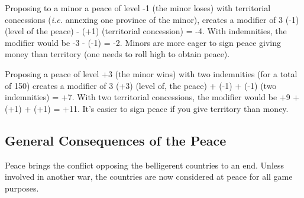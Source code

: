 



\begin{exemple}
  Proposing to a minor a peace of level -1 (the minor loses) with territorial
  concessions (\emph{i.e.} annexing one province of the minor), creates a
  modifier of 3 \textmultiply (-1) (level of the peace) - (+1) (territorial
  concession) = -4. With indemnities, the modifier would be -3 - (-1) =
  -2. Minors are more eager to sign peace giving money than territory (one
  needs to roll high to obtain peace).

  Proposing a peace of level +3 (the minor wins) with two indemnities (for a
  total of 150\ducats) creates a modifier of 3 \textmultiply (+3) (level of,
  the peace) + (-1) + (-1) (two indemnities) = +7. With two territorial
  concessions, the modifier would be +9 + (+1) + (+1) = +11. It's easier to
  sign peace if you give territory than money.
\end{exemple}

\begin{exemple}
  
\end{exemple}

\begin{exemple}
  
\end{exemple}

\subsection{General Consequences of the Peace}
\aparag Peace brings the conflict opposing the belligerent countries to an
end.
\bparag Unless involved in another war, the countries are now considered at
peace for all game purposes.

